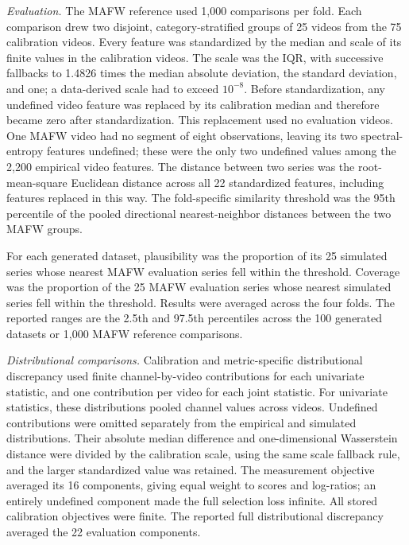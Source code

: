 \documentclass[
]{article}
\begin{document}
\emph{Evaluation.} The MAFW reference used 1,000 comparisons per fold.
Each comparison drew two disjoint, category-stratified groups of 25
videos from the 75 calibration videos. Every feature was standardized by
the median and scale of its finite values in the calibration videos. The
scale was the IQR, with successive fallbacks to 1.4826 times the median
absolute deviation, the standard deviation, and one; a data-derived
scale had to exceed \(10^{-8}\). Before standardization, any undefined
video feature was replaced by its calibration median and therefore
became zero after standardization. This replacement used no evaluation
videos. One MAFW video had no segment of eight observations, leaving its
two spectral-entropy features undefined; these were the only two
undefined values among the 2,200 empirical video features. The distance
between two series was the root-mean-square Euclidean distance across
all 22 standardized features, including features replaced in this way.
The fold-specific similarity threshold was the 95th percentile of the
pooled directional nearest-neighbor distances between the two MAFW
groups.

For each generated dataset, plausibility was the proportion of its 25
simulated series whose nearest MAFW evaluation series fell within the
threshold. Coverage was the proportion of the 25 MAFW evaluation series
whose nearest simulated series fell within the threshold. Results were
averaged across the four folds. The reported ranges are the 2.5th and
97.5th percentiles across the 100 generated datasets or 1,000 MAFW
reference comparisons.

\emph{Distributional comparisons.} Calibration and metric-specific
distributional discrepancy used finite channel-by-video contributions
for each univariate statistic, and one contribution per video for each
joint statistic. For univariate statistics, these distributions pooled
channel values across videos. Undefined contributions were omitted
separately from the empirical and simulated distributions. Their
absolute median difference and one-dimensional Wasserstein distance were
divided by the calibration scale, using the same scale fallback rule,
and the larger standardized value was retained. The measurement
objective averaged its 16 components, giving equal weight to scores and
log-ratios; an entirely undefined component made the full selection loss
infinite. All stored calibration objectives were finite. The reported
full distributional discrepancy averaged the 22 evaluation components.
\end{document}
